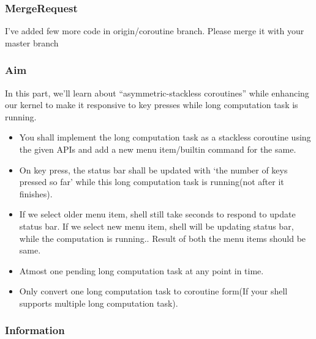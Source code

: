 \documentclass[]{book}
\newenvironment{Shaded}{}{}
\newcommand{\KeywordTok}[1]{\textbf{{#1}}}
\newcommand{\NormalTok}[1]{{#1}}
\begin{document}
\subsubsection*{MergeRequest}\label{mergerequest-4}

I've added few more code in origin/coroutine branch. Please merge it
with your master branch

\begin{Shaded}
\end{Shaded}

\subsubsection*{Aim}\label{aim-4}

In this part, we'll learn about ``asymmetric-stackless coroutines''
while enhancing our kernel to make it responsive to key presses while
long computation task is running.

\begin{itemize}
\itemsep1pt\parskip0pt
\item
  You shall implement the long computation task as a stackless coroutine
  using the given APIs and add a new menu item/builtin command for the
  same.
\item
  On key press, the status bar shall be updated with `the number of keys
  pressed so far' while this long computation task is running(not after
  it finishes).
\item
  If we select older menu item, shell still take seconds to respond to
  update status bar. If we select new menu item, shell will be updating
  status bar, while the computation is running.. Result of both the menu
  items should be same.
\item
  Atmost one pending long computation task at any point in time.
\item
  Only convert one long computation task to coroutine form(If your shell
  supports multiple long computation task).
\end{itemize}

\subsubsection*{Information}\label{information-4}
\end{document}
